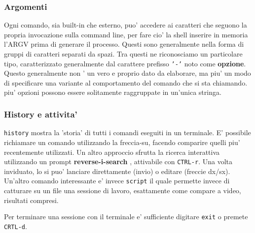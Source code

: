 \subsubsection{Argomenti}
Ogni comando, sia built-in che esterno, puo' accedere ai caratteri che seguono la propria invocazione sulla
command line, per fare cio' la shell inserire in memoria l'ARGV prima di generare il processo. Questi sono
generalmente nella forma di gruppi di caratteri separati da spazi. Tra questi ne riconosciamo un particolare
tipo, caratterizzato generalmente dal carattere prefisso \texttt{'-'} noto come \textbf{opzione}. Questo 
generalmente non ' un vero e proprio dato da elaborare, ma piu' un modo di specificare una variante al 
comportamento del comando che si sta chiamando. piu' opzioni possono essere solitamente raggruppate in un'unica
stringa.

\subsubsection{History e attivita'}
\texttt{history} mostra la 'storia' di tutti i comandi eseguiti in un terminale. 
E' possibile richiamare un comando
utilizzando la freccia-su, facendo comparire quelli piu' recentemente utilizzati. Un altro approccio sfrutta
la ricerca interattiva utilizzando un prompt \textbf{reverse-i-search} , attivabile con \texttt{CTRL-r}. 
Una volta inviduato, lo si puo' lanciare direttamente (invio) o editare (freccie dx/sx). \\

Un'altro comando interessante e' invece \texttt{script} il quale permette invece di catturare su un file 
una sessione di lavoro, esattamente come compare a video, risultati compresi.

Per terminare una sessione con il terminale e' sufficiente digitare \texttt{exit} o premete \texttt{CRTL-d}.

